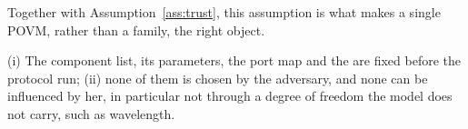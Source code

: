 
Together with Assumption~\ref{ass:trust}, this assumption is what makes a
single POVM, rather than a family, the right object.

\begin{assumption}
\label{ass:nosel}
(i) The component list, its parameters, the port map and the
 are fixed before the protocol run;
(ii) none of them is chosen by the adversary, and none can be influenced by
her, in particular not through a degree of freedom the model does not carry,
such as wavelength.
\end{assumption}
